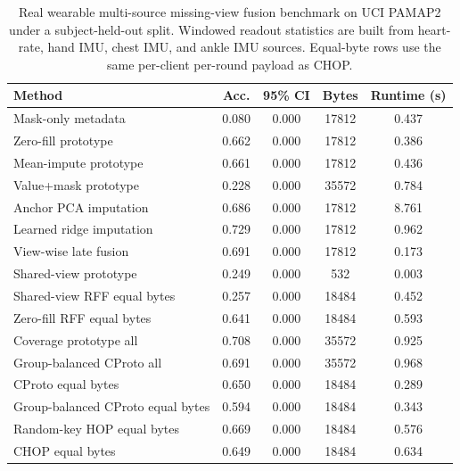 \begin{table}[t]
\centering
\caption{Real wearable multi-source missing-view fusion benchmark on UCI PAMAP2 under a subject-held-out split. Windowed readout statistics are built from heart-rate, hand IMU, chest IMU, and ankle IMU sources. Equal-byte rows use the same per-client per-round payload as CHOP.}
\label{tab:if-pamap2-fusion}
\scriptsize
\setlength{\tabcolsep}{3pt}
\renewcommand{\arraystretch}{0.94}
\begin{tabular}{lcccc}
\toprule
Method & Acc. & 95\% CI & Bytes & Runtime (s) \\
\midrule
Mask-only metadata & 0.080 & 0.000 & 17812 & 0.437 \\
Zero-fill prototype & 0.662 & 0.000 & 17812 & 0.386 \\
Mean-impute prototype & 0.661 & 0.000 & 17812 & 0.436 \\
Value+mask prototype & 0.228 & 0.000 & 35572 & 0.784 \\
Anchor PCA imputation & 0.686 & 0.000 & 17812 & 8.761 \\
Learned ridge imputation & 0.729 & 0.000 & 17812 & 0.962 \\
View-wise late fusion & 0.691 & 0.000 & 17812 & 0.173 \\
Shared-view prototype & 0.249 & 0.000 & 532 & 0.003 \\
Shared-view RFF equal bytes & 0.257 & 0.000 & 18484 & 0.452 \\
Zero-fill RFF equal bytes & 0.641 & 0.000 & 18484 & 0.593 \\
Coverage prototype all & 0.708 & 0.000 & 35572 & 0.925 \\
Group-balanced CProto all & 0.691 & 0.000 & 35572 & 0.968 \\
CProto equal bytes & 0.650 & 0.000 & 18484 & 0.289 \\
Group-balanced CProto equal bytes & 0.594 & 0.000 & 18484 & 0.343 \\
Random-key HOP equal bytes & 0.669 & 0.000 & 18484 & 0.576 \\
CHOP equal bytes & 0.649 & 0.000 & 18484 & 0.634 \\
\bottomrule
\end{tabular}
\end{table}
